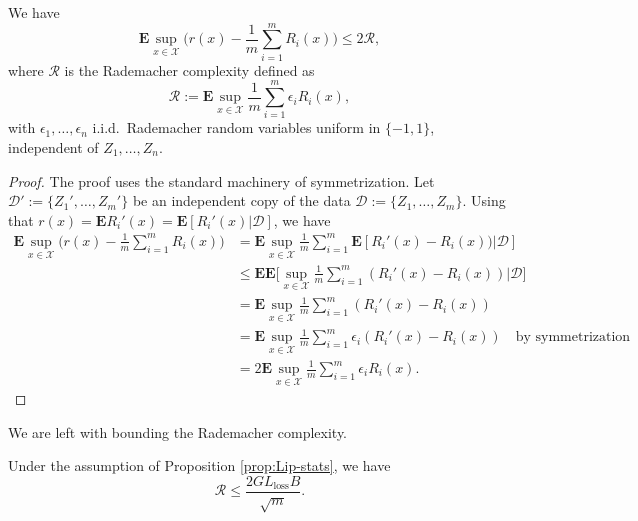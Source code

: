 \begin{proposition}
\label{prop:radamacher}
We have
$$
	\mathbf{E}\sup_{x\in\mathcal{X}} \bigg( r(x) - \frac{1}{m}\sum_{i=1}^m R_i(x) \bigg)
	\le 
	2 \mathcal{R},
$$
where $\mathcal{R}$ is the Rademacher complexity defined as
$$
	\mathcal{R}:=\mathbf{E} \sup_{x\in\mathcal{X}} \frac{1}{m}\sum_{i=1}^m\epsilon_i R_i(x) ,
$$
with $\epsilon_1,\ldots,\epsilon_n$ i.i.d.\ Rademacher random variables uniform in $\{-1,1\}$, independent of $Z_1,\ldots,Z_n$. 
\end{proposition}

\begin{proof}
The proof uses the standard machinery of symmetrization. Let $\mathcal{D}':=\{Z_1',\ldots,Z_m'\}$ be an independent copy of the data $\mathcal{D}:=\{Z_1,\ldots,Z_m\}$. Using that $r(x)=\mathbf{E}R_i'(x)=\mathbf{E}[R_i'(x)|\mathcal{D}]$, we have
\begin{align*}
	\mathbf{E}\sup_{x\in\mathcal{X}} \bigg( r(x) - \frac{1}{m}\sum_{i=1}^m R_i(x) \bigg)
	&=
	\mathbf{E}\sup_{x\in\mathcal{X}} \frac{1}{m}\sum_{i=1}^m \mathbf{E} [ R_i'(x) - R_i(x) ) | \mathcal{D}]\\
	&\le
	\mathbf{E}\mathbf{E}\bigg[\sup_{x\in\mathcal{X}} \frac{1}{m}\sum_{i=1}^m ( R_i'(x) - R_i(x)) \bigg| \mathcal{D}\bigg]\\
	&=
	\mathbf{E}\sup_{x\in\mathcal{X}} \frac{1}{m}\sum_{i=1}^m ( R_i'(x) - R_i(x) )\\
	&=
	\mathbf{E}\sup_{x\in\mathcal{X}} \frac{1}{m}\sum_{i=1}^m \epsilon_i (R_i'(x) - R_i(x)) \quad \text{by symmetrization}\\
	&=
	2\mathbf{E}\sup_{x\in\mathcal{X}} \frac{1}{m}\sum_{i=1}^m \epsilon_i R_i(x).
\end{align*}
\end{proof}

We are left with bounding the Rademacher complexity.
\begin{proposition}
\label{prop:boundonradamacher}
Under the assumption of Proposition \ref{prop:Lip-stats}, we have
$$
	\mathcal{R}
	\le
	\frac{2GL_\textrm{loss}B}{\sqrt{m}}.
$$
\end{proposition}


